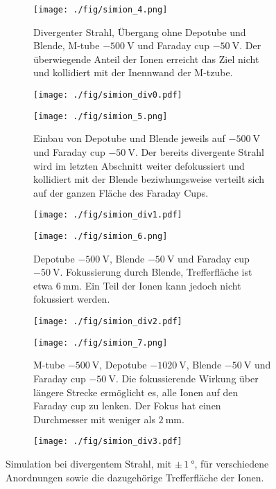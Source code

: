 \begin{figure}
  \begin{subfigure}[h]{0.50\textwidth}
    \texttt{[image: ./fig/simion\_4.png]}
    \caption{Divergenter Strahl, Übergang ohne Depotube und Blende, M-tube $\SI{-500}{\volt}$ und Faraday cup $\SI{-50}{\volt}$. Der überwiegende Anteil der Ionen erreicht das Ziel nicht und kollidiert mit der Inennwand der M-tzube.}
    \label{fig:div0}
  \end{subfigure}\hfill
  \begin{subfigure}[h]{0.4\textwidth}
    \texttt{[image: ./fig/simion\_div0.pdf]}
    \label{fig:div1}
  \end{subfigure}\hfill
  \begin{subfigure}[h]{0.50\textwidth}
    \texttt{[image: ./fig/simion\_5.png]}
    \caption{Einbau von Depotube und Blende jeweils auf $\SI{-500}{\volt}$ und Faraday cup $\SI{-50}{\volt}$. Der bereits divergente Strahl wird im letzten Abschnitt weiter defokussiert und kollidiert mit der Blende beziwhungsweise verteilt sich auf der ganzen Fläche des Faraday Cups.}
    \label{fig:div2}
  \end{subfigure}\hfill
  \begin{subfigure}[h]{0.4\textwidth}
    \texttt{[image: ./fig/simion\_div1.pdf]}
    \label{fig:div3}
  \end{subfigure}\hfill
  \begin{subfigure}[h]{0.50\textwidth}
    \texttt{[image: ./fig/simion\_6.png]}
    \caption{Depotube $\SI{-500}{\volt}$, Blende $\SI{-50}{\volt}$ und Faraday cup $\SI{-50}{\volt}$. Fokussierung durch Blende, Trefferfläche ist etwa $\SI{6}{\mm}$. Ein Teil der Ionen kann jedoch nicht fokussiert werden.}
    \label{fig:div4}
  \end{subfigure}\hfill
  \begin{subfigure}[h]{0.4\textwidth}
    \texttt{[image: ./fig/simion\_div2.pdf]}
    \label{fig:div5}
  \end{subfigure}\hfill
  \begin{subfigure}[h]{0.50\textwidth}
    \texttt{[image: ./fig/simion\_7.png]}
    \caption{M-tube $\SI{-500}{\volt}$, Depotube $\SI{-1020}{\volt}$, Blende $\SI{-50}{\volt}$ und Faraday cup $\SI{-50}{\volt}$. Die fokussierende Wirkung über längere Strecke ermöglicht es, alle Ionen auf den Faraday cup zu lenken. Der Fokus hat einen Durchmesser mit weniger als $\SI{2}{\mm}$.}
    \label{fig:div6}
  \end{subfigure}\hfill
  \begin{subfigure}[h]{0.4\textwidth}
    \texttt{[image: ./fig/simion\_div3.pdf]}
    \label{fig:div7}
  \end{subfigure}
  \caption{Simulation bei divergentem Strahl, mit $\pm\,\SI{1}{\degree}$, für verschiedene Anordnungen sowie die dazugehörige Trefferfläche der Ionen.}
  \label{fig:simion_div}
\end{figure}


